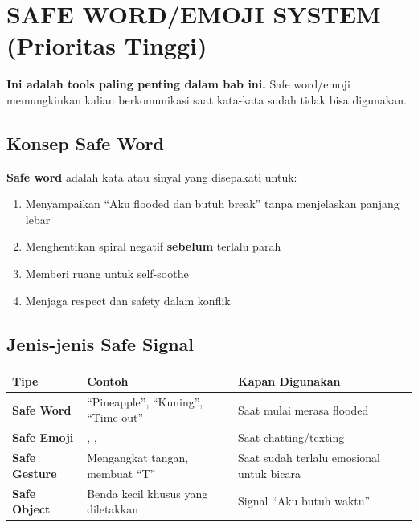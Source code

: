 \section{SAFE WORD/EMOJI SYSTEM (Prioritas Tinggi)}

\begin{insightbox}
\textbf{Ini adalah tools paling penting dalam bab ini.} Safe word/emoji memungkinkan kalian berkomunikasi saat kata-kata sudah tidak bisa digunakan.
\end{insightbox}

\subsection{Konsep Safe Word}

\begin{praktikbox}
\textbf{Safe word} adalah kata atau sinyal yang disepakati untuk:
\begin{enumerate}
    \item Menyampaikan ``Aku flooded dan butuh break'' tanpa menjelaskan panjang lebar
    \item Menghentikan spiral negatif \textbf{sebelum} terlalu parah
    \item Memberi ruang untuk self-soothe
    \item Menjaga respect dan safety dalam konflik
\end{enumerate}
\end{praktikbox}

\subsection{Jenis-jenis Safe Signal}

\begin{center}
\renewcommand{\arraystretch}{1.5}
\begin{tabular}{|>{\raggedright}p{3cm}|>{\raggedright}p{5cm}|>{\raggedright\arraybackslash}p{7cm}|}
\hline
\rowcolor{primary!20}
\textbf{Tipe} & \textbf{Contoh} & \textbf{Kapan Digunakan} \\
\hline
\textbf{Safe Word} & ``Pineapple'', ``Kuning'', ``Time-out'' & Saat mulai merasa flooded \\
\hline
\textbf{Safe Emoji} & \emoji{\faPause}, \emoji{\faHandPaper}, \emoji{\faLifeRing} & Saat chatting/texting \\
\hline
\textbf{Safe Gesture} & Mengangkat tangan, membuat ``T'' & Saat sudah terlalu emosional untuk bicara \\
\hline
\textbf{Safe Object} & Benda kecil khusus yang diletakkan & Signal ``Aku butuh waktu'' \\
\hline
\end{tabular}
\end{center}

